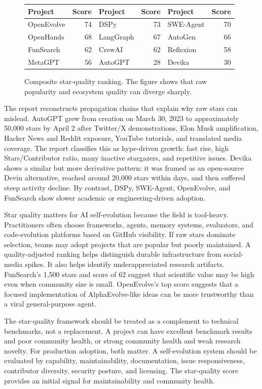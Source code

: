 \begin{figure}[t]
\centering
\begin{tabular}{lr@{\quad}lr@{\quad}lr}
\toprule
Project & Score & Project & Score & Project & Score \\
\midrule
OpenEvolve & 74 & DSPy & 73 & SWE-Agent & 70 \\
OpenHands & 68 & LangGraph & 67 & AutoGen & 66 \\
FunSearch & 62 & CrewAI & 62 & Reflexion & 58 \\
MetaGPT & 56 & AutoGPT & 28 & Devika & 30 \\
\bottomrule
\end{tabular}
\caption{Composite star-quality ranking. The figure shows that raw popularity and ecosystem quality can diverge sharply.}
\label{fig:star-quality}
\end{figure}

The report reconstructs propagation chains that explain why raw stars can mislead. AutoGPT grew from creation on March 30, 2023 to approximately 50,000 stars by April 2 after Twitter/X demonstrations, Elon Musk amplification, Hacker News and Reddit exposure, YouTube tutorials, and translated media coverage. The report classifies this as hype-driven growth: fast rise, high Stars/Contributor ratio, many inactive stargazers, and repetitive issues. Devika shows a similar but more derivative pattern: it was framed as an open-source Devin alternative, reached around 20,000 stars within days, and then suffered steep activity decline. By contrast, DSPy, SWE-Agent, OpenEvolve, and FunSearch show slower academic or engineering-driven adoption.

Star quality matters for AI self-evolution because the field is tool-heavy. Practitioners often choose frameworks, agents, memory systems, evaluators, and code-evolution platforms based on GitHub visibility. If raw stars dominate selection, teams may adopt projects that are popular but poorly maintained. A quality-adjusted ranking helps distinguish durable infrastructure from social-media spikes. It also helps identify underappreciated research artifacts. FunSearch's 1,500 stars and score of 62 suggest that scientific value may be high even when community size is small. OpenEvolve's top score suggests that a focused implementation of AlphaEvolve-like ideas can be more trustworthy than a viral general-purpose agent.

The star-quality framework should be treated as a complement to technical benchmarks, not a replacement. A project can have excellent benchmark results and poor community health, or strong community health and weak research novelty. For production adoption, both matter. A self-evolution system should be evaluated by capability, maintainability, documentation, issue responsiveness, contributor diversity, security posture, and licensing. The star-quality score provides an initial signal for maintainability and community health.


